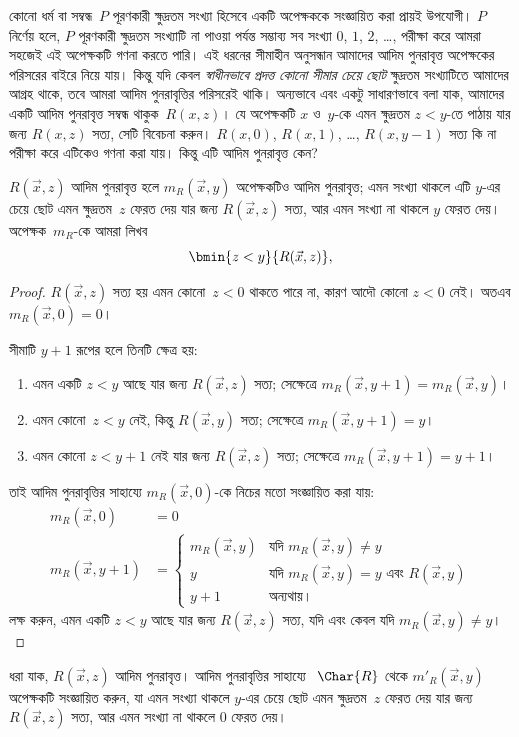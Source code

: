 \documentclass[../../../include/open-logic-section]{subfiles}
\begin{document}

\begin{explain}
কোনো ধর্ম বা সম্বন্ধ~$P$ পূরণকারী ক্ষুদ্রতম সংখ্যা হিসেবে একটি অপেক্ষককে
সংজ্ঞায়িত করা প্রায়ই উপযোগী। $P$ নির্ণেয় হলে, $P$ পূরণকারী ক্ষুদ্রতম
সংখ্যাটি না পাওয়া পর্যন্ত সম্ভাব্য সব সংখ্যা $0$, $1$, $2$, \dots,
পরীক্ষা করে আমরা সহজেই এই অপেক্ষকটি গণনা করতে পারি। এই ধরনের সীমাহীন
অনুসন্ধান আমাদের আদিম পুনরাবৃত্ত অপেক্ষকের পরিসরের বাইরে নিয়ে যায়। কিন্তু
যদি কেবল \emph{স্বাধীনভাবে প্রদত্ত কোনো সীমার চেয়ে ছোট} ক্ষুদ্রতম
সংখ্যাটিতে আমাদের আগ্রহ থাকে, তবে আমরা আদিম পুনরাবৃত্তির পরিসরেই থাকি।
অন্যভাবে এবং একটু সাধারণভাবে বলা যাক, আমাদের একটি আদিম পুনরাবৃত্ত সম্বন্ধ
থাকুক~$R(x,z)$। যে অপেক্ষকটি $x$ ও~$y$-কে এমন ক্ষুদ্রতম $z < y$-তে
পাঠায় যার জন্য $R(x, z)$ সত্য, সেটি বিবেচনা করুন। $R(x, 0)$,
$R(x, 1)$, \dots, $R(x, y-1)$ সত্য কি না পরীক্ষা করে এটিকেও গণনা করা
যায়। কিন্তু এটি আদিম পুনরাবৃত্ত কেন?
\end{explain}

\begin{prop}
$R(\vec x, z)$ আদিম পুনরাবৃত্ত হলে $m_R(\vec{x}, y)$ অপেক্ষকটিও আদিম
পুনরাবৃত্ত; এমন সংখ্যা থাকলে এটি $y$-এর চেয়ে ছোট এমন ক্ষুদ্রতম~$z$ ফেরত
দেয় যার জন্য $R(\vec x, z)$ সত্য, আর এমন সংখ্যা না থাকলে $y$ ফেরত দেয়।
অপেক্ষক~$m_R$-কে আমরা লিখব
\[
\bmin{z < y}{R(\vec{x}, z)},
\]
\end{prop}

\begin{proof}
$R(\vec{x}, z)$ সত্য হয় এমন কোনো~$z < 0$ থাকতে পারে না, কারণ আদৌ
কোনো $z < 0$ নেই। অতএব $m_R(\vec x, 0) = 0$।

সীমাটি $y + 1$ রূপের হলে তিনটি ক্ষেত্র হয়:
\begin{enumerate}
\item এমন একটি $z < y$ আছে যার জন্য $R(\vec{x}, z)$ সত্য; সেক্ষেত্রে
$m_R(\vec{x}, y+1) = m_R(\vec{x}, y)$।
\item এমন কোনো~$z<y$ নেই, কিন্তু $R(\vec{x}, y)$ সত্য; সেক্ষেত্রে
$m_R(\vec{x}, y+1) = y$।
\item এমন কোনো $z < y+1$ নেই যার জন্য $R(\vec{x}, z)$ সত্য; সেক্ষেত্রে
$m_R(\vec{x}, y+1) = y+1$।
\end{enumerate}
তাই আদিম পুনরাবৃত্তির সাহায্যে $m_R(\vec x, 0)$-কে নিচের মতো
সংজ্ঞায়িত করা যায়:
\begin{align*}
m_R(\vec{x}, 0) & = 0\\
m_R(\vec{x}, y+1) & =
\begin{cases}
m_R(\vec{x}, y) & \text{যদি $m_R(\vec x, y) \neq y$}\\
y & \text{যদি $m_R(\vec x, y) = y$ এবং $R(\vec{x}, y)$}\\
y+1 & \text{অন্যথায়।}
\end{cases}
\end{align*}
লক্ষ করুন, এমন একটি $z<y$ আছে যার জন্য $R(\vec x, z)$ সত্য, যদি এবং
কেবল যদি $m_R(\vec x,
y) \neq y$।
\end{proof}

\begin{prob}
ধরা যাক, $R(\vec x, z)$ আদিম পুনরাবৃত্ত। আদিম পুনরাবৃত্তির সাহায্যে
~$\Char{R}$ থেকে $m'_R(\vec{x}, y)$ অপেক্ষকটি সংজ্ঞায়িত করুন, যা
এমন সংখ্যা থাকলে $y$-এর চেয়ে ছোট এমন ক্ষুদ্রতম~$z$ ফেরত দেয় যার জন্য
$R(\vec{x}, z)$ সত্য, আর এমন সংখ্যা না থাকলে $0$ ফেরত দেয়।
\end{prob}
\end{document}
